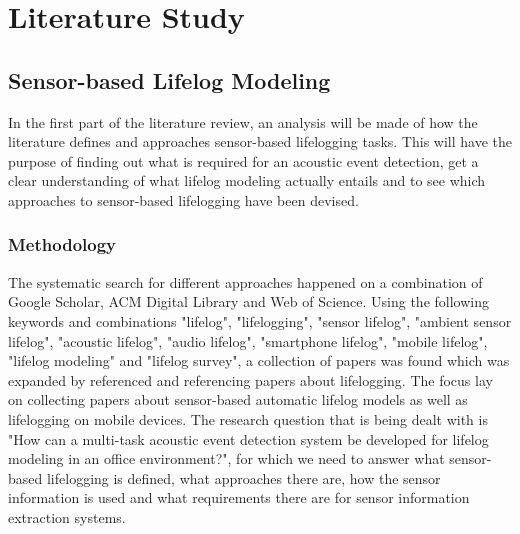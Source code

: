 \chapter{Literature Study}

%
%
\section{Sensor-based Lifelog Modeling}

In the first part of the literature review, an analysis will be made of how the literature defines and approaches sensor-based lifelogging tasks. This will have the purpose of finding out what is required for an acoustic event detection, get a clear understanding of what lifelog modeling actually entails and to see which approaches to sensor-based lifelogging have been devised. 

\subsection{Methodology}

The systematic search for different approaches happened on a combination of Google Scholar, ACM Digital Library and Web of Science. Using the following keywords and combinations "lifelog", "lifelogging", "sensor lifelog", "ambient sensor lifelog", "acoustic lifelog", "audio lifelog", "smartphone lifelog", "mobile lifelog", "lifelog modeling" and "lifelog survey", a collection of papers was found which was expanded by referenced and referencing papers about lifelogging. The focus lay on collecting papers about sensor-based automatic lifelog models as well as lifelogging on mobile devices. The research question that is being dealt with is "How can a multi-task acoustic event detection system be developed for lifelog modeling in an office environment?", for which we need to answer what sensor-based lifelogging is defined, what approaches there are, how the sensor information is used and what requirements there are for sensor information extraction systems.

